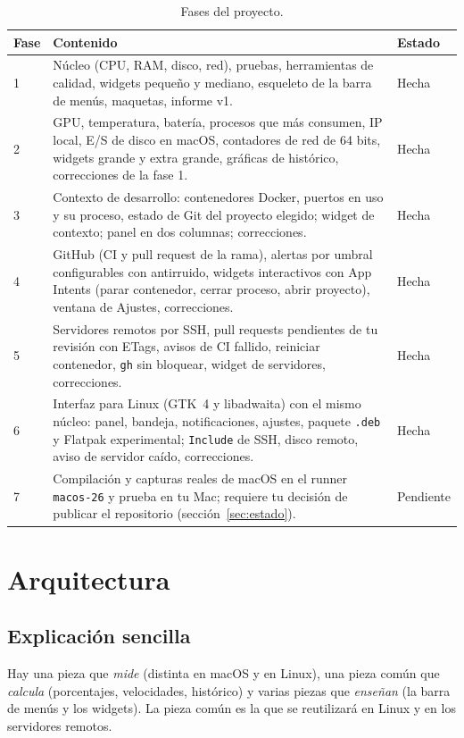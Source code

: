 \documentclass[11pt,a4paper]{article}
\begin{document}
\begin{table}[H]
\centering
\begin{tabularx}{\textwidth}{@{}lX l@{}}
\toprule
\textbf{Fase} & \textbf{Contenido} & \textbf{Estado}\\
\midrule
1 & Núcleo (CPU, RAM, disco, red), pruebas, herramientas de calidad,
    widgets pequeño y mediano, esqueleto de la barra de menús,
    maquetas, informe v1. & Hecha\\
2 & GPU, temperatura, batería, procesos que más consumen, IP local,
    E/S de disco en macOS, contadores de red de 64 bits, widgets
    grande y extra grande, gráficas de histórico, correcciones de la
    fase 1. & Hecha\\
3 & Contexto de desarrollo: contenedores Docker, puertos en uso y
    su proceso, estado de Git del proyecto elegido; widget de
    contexto; panel en dos columnas; correcciones. & Hecha\\
4 & GitHub (CI y pull request de la rama), alertas por umbral
    configurables con antirruido, widgets interactivos con App
    Intents (parar contenedor, cerrar proceso, abrir proyecto),
    ventana de Ajustes, correcciones. & Hecha\\
5 & Servidores remotos por SSH, pull requests pendientes de tu
    revisión con ETags, avisos de CI fallido, reiniciar contenedor,
    \texttt{gh} sin bloquear, widget de servidores, correcciones. &
    Hecha\\
6 & Interfaz para Linux (GTK~4 y libadwaita) con el mismo núcleo:
    panel, bandeja, notificaciones, ajustes, paquete \texttt{.deb} y
    Flatpak experimental; \texttt{Include} de SSH, disco remoto,
    aviso de servidor caído, correcciones. & Hecha\\
7 & Compilación y capturas reales de macOS en el runner
    \texttt{macos-26} y prueba en tu Mac; requiere tu decisión de
    publicar el repositorio (sección~\ref{sec:estado}). & Pendiente\\
\bottomrule
\end{tabularx}
\caption{Fases del proyecto.}
\end{table}

\section{Arquitectura}
\subsection{Explicación sencilla}
Hay una pieza que \emph{mide} (distinta en macOS y en Linux), una
pieza común que \emph{calcula} (porcentajes, velocidades, histórico)
y varias piezas que \emph{enseñan} (la barra de menús y los widgets).
La pieza común es la que se reutilizará en Linux y en los servidores
remotos.
\end{document}
